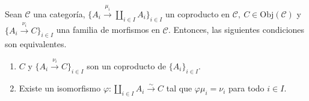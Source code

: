 \documentclass[tesis]{subfiles}
\begin{document}
\begin{Prop}\label{Mendoza-Ejer.42}
    Sean $\mathscr{C}$ una categoría, $\{A_i\xrightarrow[]{\mu_i} \coprod_{i\in I}A_i\}_{i\in I}$ un coproducto en $\mathscr{C}, \ C\in\text{Obj}(\mathscr{C})$ y $\{A_i\xrightarrow[]{\nu_i} C\}_{i\in I}$ una familia de morfismos en $\mathscr{C}$. Entonces, las siguientes condiciones son equivalentes.

    \begin{enumerate}[label=(\alph*)]
    
        \item $C$ y $\{A_i\xrightarrow[]{\nu_i} C\}_{i\in I}$ son un coproducto de $\{A_i\}_{i\in I}$.

        \item Existe un isomorfismo $\varphi:\coprod_{i\in I}A_i\xrightarrow[]{\sim}C$ tal que $\varphi\mu_i=\nu_i$ para todo $i\in I$.
    \end{enumerate}
\end{Prop}
\end{document}
